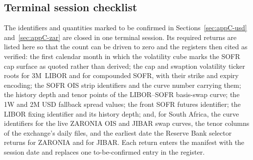 \documentclass[../../main.tex]{subfiles}
\begin{document}
\subsection{Terminal session checklist}\label{subsec:appC-checklist}

The identifiers and quantities marked to be confirmed in Sections~\ref{sec:appC-usd} and~\ref{sec:appC-zar} are closed in one terminal session. Its required returns are listed here so that the count can be driven to zero and the registers then cited as verified: the first calendar month in which the volatility cube marks the SOFR cap surface as quoted rather than derived; the cap and swaption volatility ticker roots for 3M~LIBOR and for compounded SOFR, with their strike and expiry encoding; the SOFR OIS strip identifiers and the curve number carrying them; the history depth and tenor points of the LIBOR--SOFR basis-swap curve; the 1W and 2M USD fallback spread values; the front SOFR futures identifier; the LIBOR fixing identifier and its history depth; and, for South Africa, the curve identifiers for the live ZARONIA OIS and JIBAR swap curves, the tenor columns of the exchange's daily files, and the earliest date the Reserve Bank selector returns for ZARONIA and for JIBAR. Each return enters the manifest with the session date and replaces one to-be-confirmed entry in the register.
\end{document}
